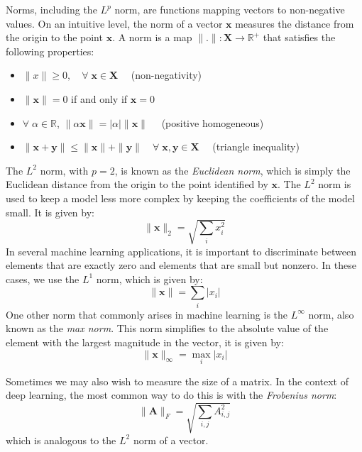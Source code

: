 \documentclass[12pt]{report}
\numberwithin{equation}{section}
\begin{document}
Norms, including the $L^p$ norm, are functions mapping vectors to non-negative
values. On an intuitive level, the norm of a vector $\bm{x}$ measures the distance from the origin to the point $\bm{x}$. A norm is a map $\|.\|:\bm{X}\rightarrow \mathbb{R}^+$ that satisfies the following properties:
\begin{itemize}
\item $\|x\| \geq 0, \quad \forall\;\bm{x}\in\bm{X} \quad$ (non-negativity)
\item $\|\bm{x}\| = 0$ if and only if $\bm{x}=0$
\item $\forall\; \alpha\in \mathbb{R}$, $\|\alpha \bm{x}\| = |\alpha|\|\bm{x}\|\quad$ (positive homogeneous)
\item $\|\bm{x}+\bm{y}\| \leq \|\bm{x}\| + \|\bm{y}\| \quad \forall\; \bm{x},\bm{y}\in\bm{X}\quad$ (triangle inequality)
\end{itemize}
The $L^2$ norm, with $p = 2$, is known as the \textit{Euclidean norm}, which is simply the Euclidean distance from the origin to the point identified by $\bm{x}$. The $L^2$ norm is used to keep a model less more complex by keeping the coefficients of the model small. It is given by:
\begin{equation}\label{eqn:l2-norm}
\|\bm{x}\|_2 = \sqrt{\sum_i x_i^2}
\end{equation} 
In several machine learning applications, it is important to discriminate between elements that are exactly zero and elements that are small but nonzero. In these cases, we use the $L^1$ norm, which is given by:
\begin{equation}\label{eqn:l1-norm}
\|\bm{x}\| = \sum_i |x_i|
\end{equation}
One other norm that commonly arises in machine learning is the $L^\infty$ norm, also known as the \textit{max norm}. This norm simplifies to the absolute value of the element with the largest magnitude in the vector, it is given by:
\begin{equation}\label{eqn:max-norm}
\|\bm{x}\|_\infty = \max_i |x_i|
\end{equation}

Sometimes we may also wish to measure the size of a matrix. In the context
of deep learning, the most common way to do this is with the \textit{Frobenius norm}:
\begin{equation}\label{eqn:fro-norm}
\|\bm{A}\|_F = \sqrt{\sum_{i,j} A_{i,j}^2}
\end{equation} 
which is analogous to the $L^2$ norm of a vector.
\end{document}
